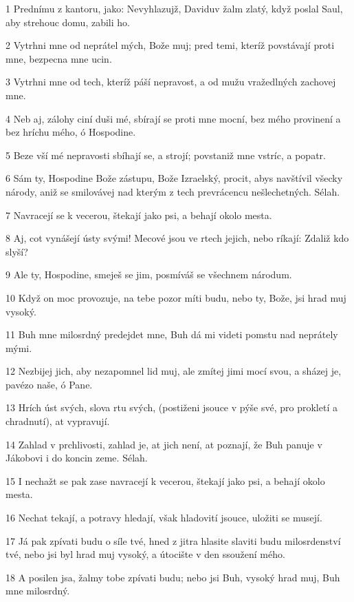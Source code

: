 \par 1 Prednímu z kantoru, jako: Nevyhlazujž, Daviduv žalm zlatý, když poslal Saul, aby strehouc domu, zabili ho.
\par 2 Vytrhni mne od neprátel mých, Bože muj; pred temi, kteríž povstávají proti mne, bezpecna mne ucin.
\par 3 Vytrhni mne od tech, kteríž páší nepravost, a od mužu vražedlných zachovej mne.
\par 4 Neb aj, zálohy ciní duši mé, sbírají se proti mne mocní, bez mého provinení a bez hríchu mého, ó Hospodine.
\par 5 Beze vší mé nepravosti sbíhají se, a strojí; povstaniž mne vstríc, a popatr.
\par 6 Sám ty, Hospodine Bože zástupu, Bože Izraelský, procit, abys navštívil všecky národy, aniž se smilovávej nad kterým z tech prevrácencu nešlechetných. Sélah.
\par 7 Navracejí se k vecerou, štekají jako psi, a behají okolo mesta.
\par 8 Aj, cot vynášejí ústy svými! Mecové jsou ve rtech jejich, nebo ríkají: Zdaliž kdo slyší?
\par 9 Ale ty, Hospodine, smeješ se jim, posmíváš se všechnem národum.
\par 10 Když on moc provozuje, na tebe pozor míti budu, nebo ty, Bože, jsi hrad muj vysoký.
\par 11 Buh mne milosrdný predejdet mne, Buh dá mi videti pomstu nad neprátely mými.
\par 12 Nezbijej jich, aby nezapomnel lid muj, ale zmítej jimi mocí svou, a sházej je, pavézo naše, ó Pane.
\par 13 Hrích úst svých, slova rtu svých, (postiženi jsouce v pýše své, pro prokletí a chradnutí), at vypravují.
\par 14 Zahlad v prchlivosti, zahlad je, at jich není, at poznají, že Buh panuje v Jákobovi i do koncin zeme. Sélah.
\par 15 I nechažt se pak zase navracejí k vecerou, štekají jako psi, a behají okolo mesta.
\par 16 Nechat tekají, a potravy hledají, však hladovití jsouce, uložiti se musejí.
\par 17 Já pak zpívati budu o síle tvé, hned z jitra hlasite slaviti budu milosrdenství tvé, nebo jsi byl hrad muj vysoký, a útocište v den ssoužení mého.
\par 18 A posilen jsa, žalmy tobe zpívati budu; nebo jsi Buh, vysoký hrad muj, Buh mne milosrdný.

